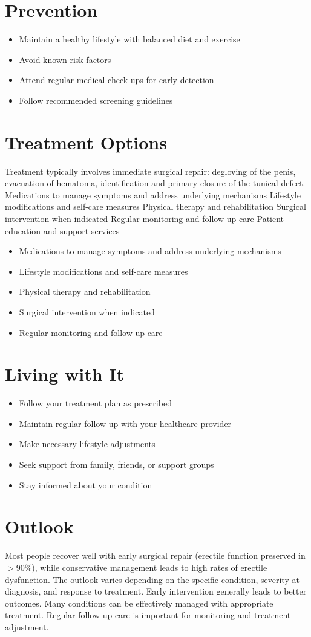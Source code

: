 \section{Prevention}
\begin{itemize}[noitemsep]
  \item Maintain a healthy lifestyle with balanced diet and exercise
  \item Avoid known risk factors
  \item Attend regular medical check-ups for early detection
  \item Follow recommended screening guidelines
\end{itemize}
\section{Treatment Options}
Treatment typically involves immediate surgical repair: degloving of the penis, evacuation of hematoma, identification and primary closure of the tunical defect. Medications to manage symptoms and address underlying mechanisms Lifestyle modifications and self-care measures Physical therapy and rehabilitation Surgical intervention when indicated Regular monitoring and follow-up care Patient education and support services

\begin{itemize}[noitemsep]
  \item Medications to manage symptoms and address underlying mechanisms
  \item Lifestyle modifications and self-care measures
  \item Physical therapy and rehabilitation
  \item Surgical intervention when indicated
  \item Regular monitoring and follow-up care
\end{itemize}
\section{Living with It}
\begin{itemize}[noitemsep]
  \item Follow your treatment plan as prescribed
  \item Maintain regular follow-up with your healthcare provider
  \item Make necessary lifestyle adjustments
  \item Seek support from family, friends, or support groups
  \item Stay informed about your condition
\end{itemize}
\section{Outlook}
Most people recover well with early surgical repair (erectile function preserved in $>$90\%), while conservative management leads to high rates of erectile dysfunction. The outlook varies depending on the specific condition, severity at diagnosis, and response to treatment. Early intervention generally leads to better outcomes. Many conditions can be effectively managed with appropriate treatment. Regular follow-up care is important for monitoring and treatment adjustment.
